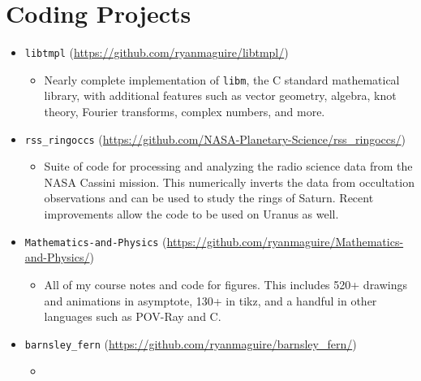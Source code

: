 \documentclass[a4paper,sans]{moderncv}
\begin{document}
    \section{Coding Projects}
        \begin{itemize}
            \item
                \texttt{libtmpl} (\url{https://github.com/ryanmaguire/libtmpl/})
                \begin{itemize}
                    \item
                        Nearly complete implementation of \texttt{libm}, the
                        C standard mathematical library, with additional
                        features such as vector geometry, algebra, knot theory,
                        Fourier transforms, complex numbers, and more.
                \end{itemize}
            \item
                \texttt{rss\_ringoccs} (\url{https://github.com/NASA-Planetary-Science/rss_ringoccs/})
                \begin{itemize}
                    \item
                        Suite of code for processing and analyzing the radio
                        science data from the NASA Cassini mission. This
                        numerically inverts the data from occultation
                        observations and can be used to study the rings of
                        Saturn. Recent improvements allow the code to be used on
                        Uranus as well.
                \end{itemize}
            \item
                \texttt{Mathematics-and-Physics} (\url{https://github.com/ryanmaguire/Mathematics-and-Physics/})
                \begin{itemize}
                    \item
                        All of my course notes and code for figures. This
                        includes 520+ drawings and animations in asymptote,
                        130+ in tikz, and a handful in other languages such as
                        POV-Ray and C.
                \end{itemize}
            \item
                \texttt{barnsley\_fern} (\url{https://github.com/ryanmaguire/barnsley_fern/})
                \begin{itemize}
                    \item

\end{itemize}
\end{itemize}
\end{document}
